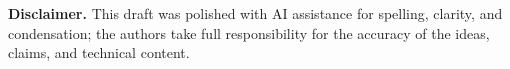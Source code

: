 \documentclass[sigconf]{acmart}
\begin{document}



\maketitle












% 

\vspace{0.75\baselineskip}
\noindent\textbf{Disclaimer.} This draft was polished with AI assistance for spelling, clarity, and condensation; the authors take full responsibility for the accuracy of the ideas, claims, and technical content.



\end{document}

